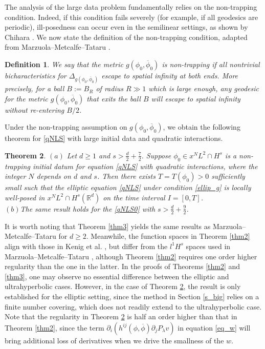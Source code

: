 \documentclass[10pt,twoside,a4paper]{article}
\newtheorem{thm}{Theorem}[section]
\newtheorem{defn}[thm]{Definition}
\numberwithin{equation}{section}\allowdisplaybreaks
\def\geq{\geqslant}
\begin{document}
The analysis of the large  data problem fundamentally relies on the non-trapping condition. Indeed, if this condition fails severely (for example, if all geodesics are periodic), ill-posedness can occur  even in  the semilinear settings, as shown by Chihara \cite{chihara2002initial}. We now state the definition of the non-trapping condition, adapted from Marzuola–Metcalfe–Tataru \cite{marzuola2021quasilinear}.
\begin{defn} \label{def_nontrap}
	We say that the metric $g\left(\phi_0, \overline{\phi}_0\right)$ is non-trapping if all nontrivial bicharacteristics for $\Delta_{g\left(\phi_0, \overline{\phi}_0\right)}$ escape to spatial infinity at both ends. More precisely, for a ball $ B:=B_R $ of radius $  R \gg 1 $ which is large enough, any geodesic for the metric $g\left(\phi_0, \overline{\phi}_0\right)$ that exits the ball $B$ will escape to spatial infinity without re-entering $B / 2$.
\end{defn}
Under the non-trapping assumption on \( g(\phi_0, \overline{\phi}_0) \), we obtain the following theorem for \eqref{qNLS} with large initial data and quadratic interactions.
\begin{thm} \label{thm_bigdata}
	$ 	(a) $  Let $d \geq 1$ and $s > \frac{d}{2} + \frac{7}{2}$. Suppose $\phi_0 \in x^N L^2 \cap H^s$ is a non-trapping initial datum for equation \eqref{qNLS} with quadratic interactions, where the integer $N$ depends  on $d$ and $s$. Then there exists  $T = T(\phi_0) > 0$  sufficiently small such that the elliptic equation \eqref{qNLS} under condition \eqref{ellip_g} is locally well-posed in $x^N L^2 \cap H^s(\mathbb{R}^d)$ on the time interval $I = [0, T]$.\\
	$ 	(b)  $The same result holds for the \eqref{qNLS0} with $s>\frac{d}{2}+\frac 92$.
\end{thm}

 It is worth noting that Theorem \ref{thm3} yields the same results as Marzuola–Metcalfe–Tataru \cite{marzuola2014quasilinear} for \(d \geq 2\). Meanwhile, the function spaces in Theorem \ref{thm2} align with those in Kenig et al. \cite{kenig2004cauchy,kenig2005variable,kenig2006general}, but differ from the \(l^1H^s\) spaces used in Marzuola–Metcalfe–Tataru \cite{marzuola2012quasilinear}, although Theorem \ref{thm2} requires one order higher regularity than the one in the latter.
 In the proofs of Theorems \ref{thm2} and \ref{thm3}, one may observe no essential difference between the elliptic and ultrahyperbolic cases. However, in the case of Theorem \ref{thm_bigdata}, the result is only established for the elliptic setting, since the method in Section \ref{s_big} relies on a finite number covering, which does not readily extend to the ultrahyperbolic case.
 Note that the regularity  in Theorem \ref{thm_bigdata} is half an order higher than that in Theorem \ref{thm2}, since   the term $\partial_i\left( h^{ij}(\phi,\overline{\phi}) \partial_j P_{\lambda} v \right)$ in equation \eqref{eq_w} will bring additional loss of derivatives when we drive the smallness of the $w$.
\end{document}
